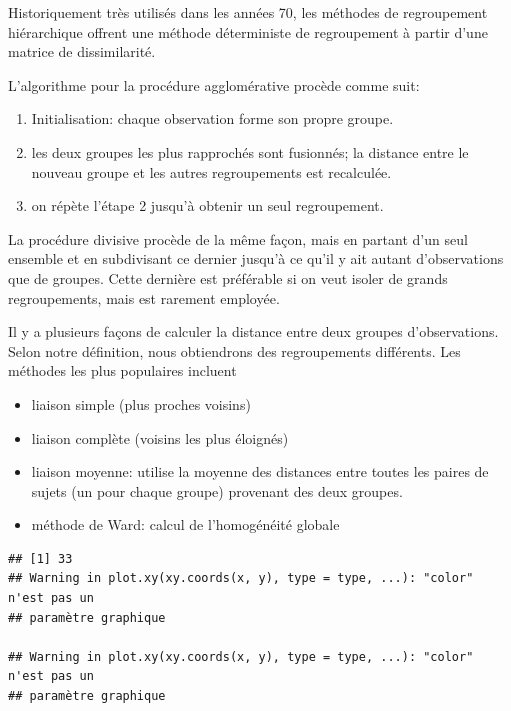 \documentclass[
  11pt,
  letterpaper,
]{book}
\providecommand{\tightlist}{%
  \setlength{\itemsep}{0pt}\setlength{\parskip}{0pt}}\usepackage{longtable,booktabs,array}
\theoremstyle{definition}
\theoremstyle{remark}
\begin{document}
Historiquement très utilisés dans les années 70, les méthodes de
regroupement hiérarchique offrent une méthode déterministe de
regroupement à partir d'une matrice de dissimilarité.

L'algorithme pour la procédure agglomérative procède comme suit:

\begin{enumerate}
\def\labelenumi{\arabic{enumi}.}
\tightlist
\item
  Initialisation: chaque observation forme son propre groupe.
\item
  les deux groupes les plus rapprochés sont fusionnés; la distance entre
  le nouveau groupe et les autres regroupements est recalculée.
\item
  on répète l'étape 2 jusqu'à obtenir un seul regroupement.
\end{enumerate}

La procédure divisive procède de la même façon, mais en partant d'un
seul ensemble et en subdivisant ce dernier jusqu'à ce qu'il y ait autant
d'observations que de groupes. Cette dernière est préférable si on veut
isoler de grands regroupements, mais est rarement employée.

Il y a plusieurs façons de calculer la distance entre deux groupes
d'observations. Selon notre définition, nous obtiendrons des
regroupements différents. Les méthodes les plus populaires incluent

\begin{itemize}
\tightlist
\item
  liaison simple (plus proches voisins)
\item
  liaison complète (voisins les plus éloignés)
\item
  liaison moyenne: utilise la moyenne des distances entre toutes les
  paires de sujets (un pour chaque groupe) provenant des deux groupes.
\item
  méthode de Ward: calcul de l'homogénéité globale
\end{itemize}

\begin{verbatim}
## [1] 33
## Warning in plot.xy(xy.coords(x, y), type = type, ...): "color" n'est pas un
## paramètre graphique

## Warning in plot.xy(xy.coords(x, y), type = type, ...): "color" n'est pas un
## paramètre graphique
\end{verbatim}
\end{document}
